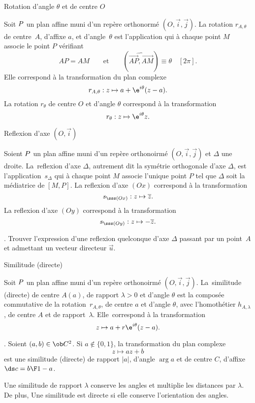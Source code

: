 \Concept [] Rotation d'angle $\theta$ et de centre $O$

\noindent
Soit $\sc P$ un plan affine muni d'un rep\`ere orthonorm\'e $(O,\vec i,\vec j)$. 
La rotation $r_{A,\theta}$ de centre~$A$, d'affixe $a$, et d'angle~$\theta$ est l'application qui \`a chaque point $M$ associe le point $P$ v\'erifiant 
$$
AP=AM\qquad\mbox{et}\qquad (\widehat{\vec{AP},\vec{AM}})\equiv\theta\quad[2\pi].
$$
Elle correspond \`a la transformation du plan complexe 
$$
r_{A,\theta}:z\mapsto a+\e^{i\theta}(z-a). 
$$ 
La rotation $r_\theta$ de centre $O$ et d'angle $\theta$ correspond \`a la transformation 
$$
{r_\theta:z\mapsto\e^{i\theta}z}.
$$

\Concept [] Reflexion d'axe $(O,\vec i)$

\noindent
Soient $\sc P$ un plan affine muni d'un rep\`ere orthonoirm\'e $(O,\vec i,\vec j)$ et $\Delta$ une droite. 
La~reflexion d'axe $\Delta$, autrement dit la sym\'etrie orthogonale d'axe $\Delta$, est l'application~$s_\Delta$ qui \`a chaque point $M$ associe l'unique point $P$ tel que $\Delta$ soit la m\'ediatrice de $[M,P]$. 
\bigskip
\noindent
La reflexion d'axe $(Ox)$ correspond \`a la transformation 
$$
{
s_{\sss(Ox)}:z\mapsto \overline z}. 
$$ 
La reflexion d'axe $(Oy)$ correspond \`a la transformation 
$$
{
s_{\sss(Oy)}:z\mapsto -\overline z}.
$$

\Exercice. Trouver l'expression d'une reflexion quelconque d'axe $\Delta$ passant par un point~$A$ et admettant un vecteur directeur $\vec u$. 
\bigskip

\Concept [] Similitude (directe)

\noindent
Soit $\sc P$ un plan affine muni d'un rep\`ere orthonoirm\'e $(O,\vec i,\vec j)$. La~similitude (directe) de centre $A(a)$, de rapport $\lambda>0$ et d'angle $\theta$ est la compos\'ee commutative de la rotation~$r_{A,\theta}$, 
de centre $a$ et d'angle $\theta$, avec l'homoth\'etier $h_{A,\lambda}$, de centre $A$ et de rapport~$\lambda$. 
Elle~correspond \`a la transformation 
$$
{z\mapsto a+r\e^{i\theta}(z-a)}. 
$$

\Remarque. Soient $(a,b)\in\ob C^2$. Si $a\notin\{0,1\}$, la transformation du plan complexe 
$$
z\mapsto az+b
$$
est une similitude (directe) de rapport $|a|$, d'angle $\arg a$ et de centre $C$, d'affixe $\ds c={b\F 1-a}$. 
\bigskip

\noindent
Une similitude de rapport $\lambda$ conserve les angles et multiplie les distances par $\lambda$. De plus, Une similitude est directe si elle conserve l'orientation des angles. 

